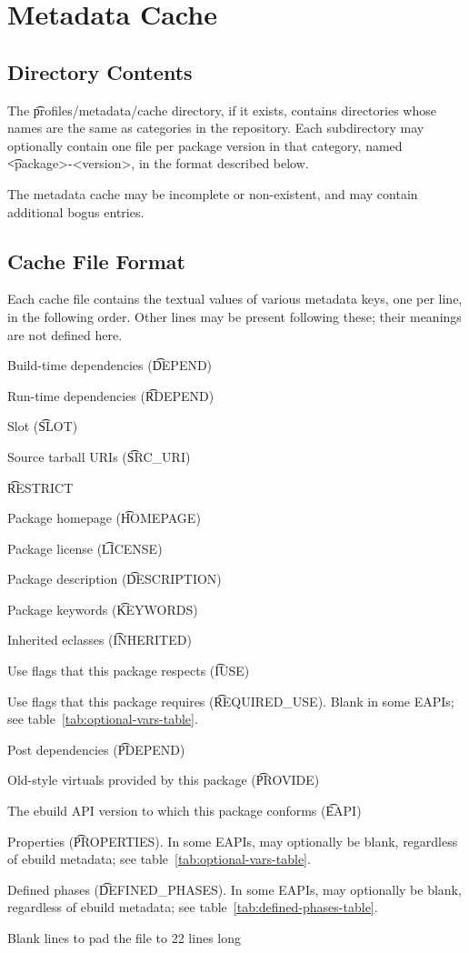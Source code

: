 \chapter{Metadata Cache}
\label{metadata-cache}

\section{Directory Contents}

The \t{profiles/metadata/cache} directory, if it exists, contains directories whose names are the
same as categories in the repository. Each subdirectory may optionally contain one file per package
version in that category, named \t{<package>-<version>}, in the format described below.

The metadata cache may be incomplete or non-existent, and may contain additional bogus entries.

\section{Cache File Format}

Each cache file contains the textual values of various metadata keys, one per line, in the following
order. Other lines may be present following these; their meanings are not defined here.

\begin{compactenum}
\item Build-time dependencies (\t{DEPEND})
\item Run-time dependencies (\t{RDEPEND})
\item Slot (\t{SLOT})
\item Source tarball URIs (\t{SRC\_URI})
\item \t{RESTRICT}
\item Package homepage (\t{HOMEPAGE})
\item Package license (\t{LICENSE})
\item Package description (\t{DESCRIPTION})
\item Package keywords (\t{KEYWORDS})
\item Inherited eclasses (\t{INHERITED})
\item Use flags that this package respects (\t{IUSE})
\item Use flags that this package requires (\t{REQUIRED\_USE}).
    Blank in some EAPIs; see table~\ref{tab:optional-vars-table}.
\item Post dependencies (\t{PDEPEND})
\item Old-style virtuals provided by this package (\t{PROVIDE})
\item The ebuild API version to which this package conforms (\t{EAPI})
\item Properties (\t{PROPERTIES}). In some EAPIs, may optionally be blank, regardless of ebuild
    metadata; see table~\ref{tab:optional-vars-table}.
\item Defined phases (\t{DEFINED\_PHASES}). In some EAPIs, may optionally be blank, regardless of
    ebuild metadata; see table~\ref{tab:defined-phases-table}.
\item Blank lines to pad the file to 22 lines long
\end{compactenum}

